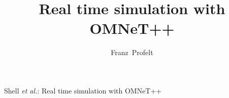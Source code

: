 \documentclass[journal]{IEEEtran}
\begin{document}
%
\title{Real time simulation with OMNeT++}
%
%
%

\author{Franz~Profelt}%

% 
%



%
{Shell \MakeLowercase{\textit{et al.}}: Real time simulation with OMNeT++}
% 
\end{document}
